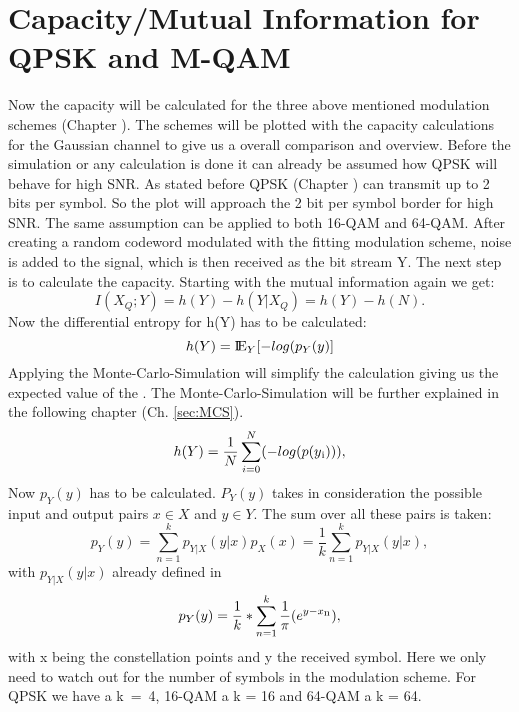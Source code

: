\section{Capacity/Mutual Information for QPSK and M-QAM}
Now the capacity will be calculated for the three above mentioned modulation schemes (Chapter ). The schemes will be plotted with the capacity calculations for the Gaussian channel to give us a overall comparison and overview.
\newline
Before the simulation or any calculation is done it can already be assumed how QPSK will behave for high SNR. As stated before QPSK (Chapter ) can transmit up to 2 bits per symbol. So the plot will approach the 2 bit per symbol border for high SNR. The same assumption can be applied to both 16-QAM and 64-QAM.
After creating a random codeword modulated with the fitting modulation scheme, noise is added to the signal, which is then received as the bit stream Y. The next step is to calculate the capacity. 
\newline
Starting with the mutual information again we get:
\begin{equation}
I(X_Q;Y) = h(Y) - h(Y|X_Q) = h(Y) - h(N).
\end{equation}
Now the differential entropy for h(Y) has to be calculated: 
\begin{equation}
\label{eq:MCEntropy}
h(Y) = {\mbox{I\negthinspace E}}_Y[-log(p_Y(y)]
\end{equation}
Applying the Monte-Carlo-Simulation will simplify the calculation giving us the expected value of the . The Monte-Carlo-Simulation will be further explained in the following chapter (Ch. \ref{sec:MCS}).
\begin{equation}
\label{eq:entropy1}
h(Y) =  \frac{1}{N}\sum_{i=0}^N(-log(p(y\textsubscript{i}))),
\end{equation} 
Now $p_Y(y)$ has to be calculated. $P_Y(y)$ takes in consideration the possible input and output pairs $x \in X$ and $y \in Y$. The sum over all these pairs is taken:
\begin{equation}
\label{eq:entropy2.1}
p_Y(y) = \sum_{n=1}^{k}p_{Y|X}(y|x)p_X(x) = \frac{1}{k}\sum_{n=1}^{k}p_{Y|X}(y|x), 
\end{equation}
with $p_{Y|X}(y|x)$ already defined in  
\begin{equation}
\label{eq:entropy2}
p_Y(y) = \frac{1}{k}*\sum_{n=1}^{k}\frac{1}{\pi}(e^{y-x\textsubscript{n}}),
\end{equation} 
with x being the constellation points and y the received symbol.
Here we only need to watch out for the number of symbols in the modulation scheme. For QPSK we have a \mbox{k = 4}, 16-QAM a k = 16 and 64-QAM a k = 64.
\newline
